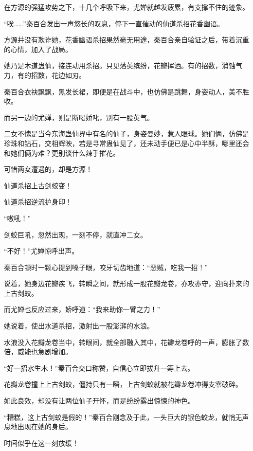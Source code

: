 
\begin{this_body}

在方源的强猛攻势之下，十几个呼吸下来，尤婵就越发疲累，有支撑不住的迹象。

“唉……”秦百合发出一声悠长的叹息，停下一直催动的仙道杀招花香幽语。

方源并没有欺诈她，花香幽语杀招果然毫无用途，秦百合亲自验证之后，带着沉重的心情，加入了战局。

她乃是木道蛊仙，接连动用杀招。只见落英缤纷，花瓣挥洒。有的招数，消蚀气力，有的招数，花边如刃。

秦百合衣袂飘飘，黑发长裙，即便是在战斗中，也仿佛是跳舞，身姿动人，美不胜收。

而另一边的尤婵，则是断喝娇叱，别有一股英气。

二女不愧是当今东海蛊仙界中有名的仙子，身姿曼妙，惹人眼球。她们俩，仿佛是珍珠和钻石，交相辉映，若是寻常蛊仙见了，还未动手便已是心中半酥，哪里还会和她们俩为难？更别谈什么辣手摧花。

可惜两女遭遇的，却是方源！

仙道杀招上古剑蛟变！

仙道杀招逆流护身印！

“嗷吼！”

剑蛟巨吼，忽然出现，一刻不停，就直冲二女。

“不好！”尤婵惊呼出声。

秦百合顿时一颗心提到嗓子眼，咬牙切齿地道：“恶贼，吃我一招！”

说着，她身边花瓣疾飞，转瞬之间，就形成一股花瓣龙卷，亦攻亦守，迎向扑来的上古剑蛟。

而尤婵也反应过来，娇呼道：“我来助你一臂之力！”

她说着，使出水道杀招，激射出一股澎湃的水浪。

水浪没入花瓣龙卷当中，转眼间，就全部融入其中，花瓣龙卷呼的一声，膨胀了数倍，威能也急剧增加。

“好一招水生木！”秦百合交口称赞，自信心立即拔升一筹上去。

花瓣龙卷撞上上古剑蛟，僵持只有一瞬，上古剑蛟就被花瓣龙卷冲得支零破碎。

如此良效，却没有让两位仙子开怀，而是纷纷露出惊悚的神色。

“糟糕，这上古剑蛟是假的！”秦百合刚念及于此，一头巨大的银色蛟龙，就悄无声息地出现在她的身后。

时间似乎在这一刻放缓！


\end{this_body}
